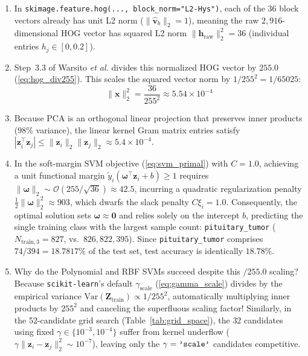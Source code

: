 \documentclass[conference]{IEEEtran}
\begin{document}
\begin{enumerate}
    \item In \texttt{skimage.feature.hog(..., block\_norm="L2-Hys")}, each of the $36$ block vectors already has unit L2 norm ($\|\hat{\mathbf{v}}_b\|_2 = 1$), meaning the raw $2,916$-dimensional HOG vector has squared L2 norm $\|\mathbf{h}_{\text{raw}}\|_2^2 = 36$ (individual entries $h_j \in [0, 0.2]$).
    \item Step~3.3 of Warsito \emph{et al.} \cite{warsito2026lightweight} divides this normalized HOG vector by $255.0$ (\ref{eq:hog_div255}). This scales the squared vector norm by $1/255^2 = 1/65025$:
    \begin{equation}
        \|\mathbf{x}\|_2^2 = \frac{36}{255^2} \approx 5.54 \times 10^{-4}
    \end{equation}
    \item Because PCA is an orthogonal linear projection that preserves inner products ($98\%$ variance), the linear kernel Gram matrix entries satisfy $|\mathbf{z}_i^\top \mathbf{z}_j| \le \|\mathbf{z}_i\|_2 \|\mathbf{z}_j\|_2 \approx 5.4 \times 10^{-4}$.
    \item In the soft-margin SVM objective (\ref{eq:svm_primal}) with $C = 1.0$, achieving a unit functional margin $\tilde{y}_i (\boldsymbol{\omega}^\top \mathbf{z}_i + b) \ge 1$ requires $\|\boldsymbol{\omega}\|_2 \sim \mathcal{O}(255 / \sqrt{36}) \approx 42.5$, incurring a quadratic regularization penalty $\frac{1}{2}\|\boldsymbol{\omega}\|_2^2 \approx 903$, which dwarfs the slack penalty $C \xi_i = 1.0$. Consequently, the optimal solution sets $\boldsymbol{\omega} \approx \mathbf{0}$ and relies solely on the intercept $b$, predicting the single training class with the largest sample count: \texttt{pituitary\_tumor} ($N_{\text{train}, 3} = 827$, vs.\ $826, 822, 395$). Since \texttt{pituitary\_tumor} comprises $74 / 394 = 18.7817\%$ of the test set, test accuracy is identically $18.78\%$.
    \item Why do the Polynomial and RBF SVMs succeed despite this $/255.0$ scaling? Because \texttt{scikit-learn}'s default $\gamma_{\text{scale}}$ (\ref{eq:gamma_scale}) divides by the empirical variance $\text{Var}(\mathbf{Z}_{\text{train}}) \propto 1/255^2$, automatically multiplying inner products by $255^2$ and canceling the superfluous scaling factor! Similarly, in the 52-candidate grid search (Table~\ref{tab:grid_space}), the $32$ candidates using fixed $\gamma \in \{10^{-3}, 10^{-4}\}$ suffer from kernel underflow ($\gamma \|\mathbf{z}_i - \mathbf{z}_j\|_2^2 \sim 10^{-7}$), leaving only the $\gamma = \text{\texttt{'scale'}}$ candidates competitive.
\end{enumerate}
\end{document}
